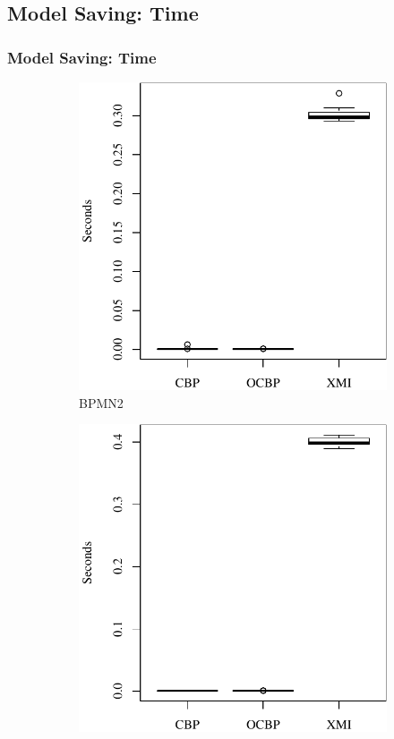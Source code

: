\documentclass{beamer}
\begin{document}
\begin{frame}[fragile]
\section{Model Saving: Time}
\frametitle{Model Saving: Time}
\begin{figure}[t]
    \begin{subfigure}{0.325\textwidth}
        \centering
        \includegraphics[width=\linewidth]{save_time_bpmn2}
        \caption{BPMN2}
        \label{fig:save_time_bpmn2}
    \end{subfigure}
    \hfill
    \begin{subfigure}{0.325\textwidth}
        \centering
        \includegraphics[width=\linewidth]{save_time_epsilon}

\end{subfigure}
\end{figure}
\end{frame}
\end{document}
